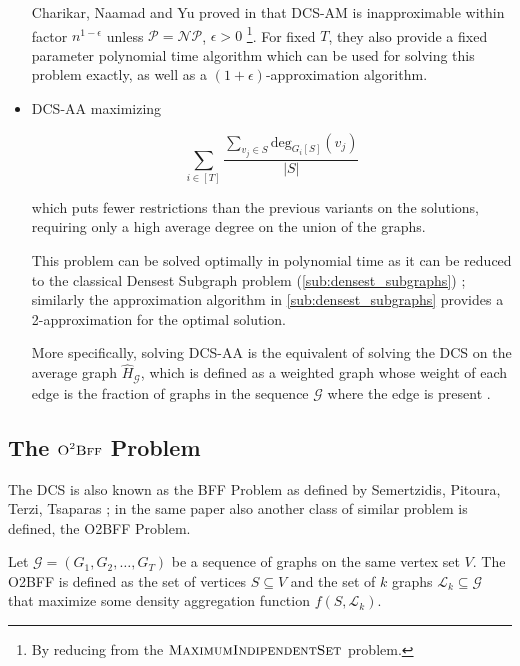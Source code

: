 \begin{itemize}
	      Charikar, Naamad and Yu proved in \cite{charikar2018finding}
	      that \acrshort{DCS}-AM is inapproximable within factor $n^{1-\epsilon} $ unless
	      $\mathcal{P} = \mathcal{NP}  $, $\epsilon > 0$
	      \footnote{By reducing from the
		      $\textsc{MaximumIndipendentSet}$ problem.}. For fixed $T$, they also provide a fixed
	      parameter polynomial time algorithm which can be used for solving
	      this problem exactly, as well as a $(1+\epsilon)$-approximation
	      algorithm.
	\item \acrshort{DCS}-AA maximizing

	      \begin{equation}
		      \label{eq:dcs-aa}
		      \sum^{}_{i \in [T]} \frac{\sum^{}_{v_{j} \in S} \text{deg}_{G_i[S]}
		      (v_{j} )}{|S|}
	      \end{equation}

	      which puts fewer restrictions than the previous variants on the
	      solutions, requiring only a high average degree on the union of the
	      graphs.

	      This problem can be solved optimally in polynomial time as it can be
	      reduced to the classical Densest Subgraph problem
	      (\autoref{sub:densest_subgraphs}) \cite{semertzidis2019finding};
	      similarly the approximation algorithm in
	      \autoref{sub:densest_subgraphs}
	      provides a 2-approximation for the optimal solution.

	      More specifically, solving \acrshort{DCS}-AA is the equivalent of solving
	      the \acrfull{DCS} on the average graph $\hat{H}_{\mathcal{G} }  $,
	      which is defined as a weighted graph whose weight of each edge is the
	      fraction of graphs in the sequence $\mathcal{G} $ where the edge is
	      present \cite{semertzidis2019finding}.
\end{itemize}

\subsection{The $\textsc{O}^{2} \textsc{Bff}$ Problem}%
\label{sub:the_o_2_bff_problem}

The \acrshort{DCS} is also known as the \acrfull{BFF} Problem as defined by Semertzidis, Pitoura, Terzi, Tsaparas
\cite{semertzidis2019finding}; in the same paper also another class of similar
problem is defined, the \acrlong{O2BFF} Problem.

Let $\mathcal{G} = (G_1, G_2, \dots, G_T) $ be a sequence of graphs on the same
vertex set $V$. The \acrfull{O2BFF} is defined as the set of
vertices $S \subseteq V$ and the set of $k$ graphs $\mathcal{L}_{k} \subseteq
	\mathcal{G}  $ that maximize some density aggregation function $f(S,
	\mathcal{L}_{k}) $.

